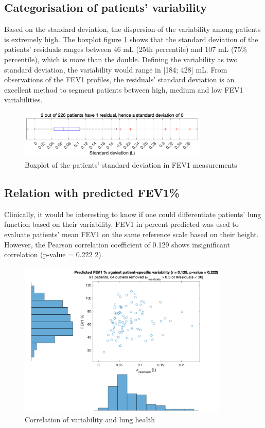\subsection{Categorisation of patients' variability}
Based on the standard deviation, the dispersion of the variability among patients is extremely high. The boxplot figure \ref{fig:fev1boxplot} shows that the standard deviation of the patients’ residuals ranges between 46 mL (25th percentile) and 107 mL (75\% percentile), which is more than the double. Defining the variability as two standard deviation, the variability would range in [184; 428] mL. From observations of the FEV1 profiles, the residuals’ standard deviation is an excellent method to segment patients between high, medium and low FEV1 variabilities.

\begin{figure}[!h]
    \centering
    \includegraphics[width=90mm]{images/fev1boxplot.png}
    \caption{Boxplot of the patients' standard deviation in FEV1 measurements}
    \label{fig:fev1boxplot}
\end{figure}

\subsection{Relation with predicted FEV1\%}
Clinically, it would be interesting to know if one could differentiate patients' lung function based on their variability. FEV1 in percent predicted was used to evaluate patients' mean FEV1 on the same reference scale based on their height. However, the Pearson correlation coefficient of 0.129 shows insignificant correlation (p-value = 0.222 \ref{fig:correlation}). 

\begin{figure}[!h]
    \centering
    \includegraphics[width=100mm]{images/fevModelBasedAnalysis_variabilityvsFEV1.png}
    \caption{Correlation of variability and lung health}
    \label{fig:correlation}
\end{figure}

